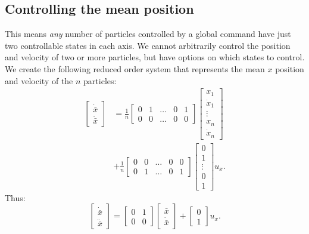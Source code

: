 \subsection{Controlling the mean position}\label{sec:controlMeanPosition}
This means \emph{any} number of particles controlled by a global command have just two controllable states in each axis. We cannot arbitrarily control the position and velocity of two or more particles, but have options on which states to control.  %
We create the following reduced order system that represents the mean $x$ position and velocity of the $n$ particles:
\begin{align}
\begin{bmatrix}\nonumber
\dot{\bar{x}} \\
\ddot{\bar{x}}
\end{bmatrix} &= \frac{1}{n} \begin{bmatrix}
0& 1& \ldots &0& 1 \\
0& 0& \ldots &0& 0
\end{bmatrix}
\begin{bmatrix}
x_{1}\\
\dot{x}_{1}\\
\vdots\\
x_{n}\\
\dot{x}_{n}
\end{bmatrix} \\
&+ \frac{1}{n}\begin{bmatrix}
0& 0&  \ldots &0& 0 \\
0& 1&  \ldots &0& 1
\end{bmatrix}\begin{bmatrix} 
0\\
1\\
\vdots\\
0\\
1
\end{bmatrix} u_x.
\end{align}
Thus:
\begin{equation}
\begin{bmatrix}
\dot{\bar{x}} \\
\ddot{\bar{x}}
\end{bmatrix} = \begin{bmatrix}
0& 1 \\
0& 0
\end{bmatrix}
\begin{bmatrix}
\bar{x}\\
\dot{\bar{x}}
\end{bmatrix} + \begin{bmatrix} 
0\\
1
\end{bmatrix} u_x.
\end{equation}

